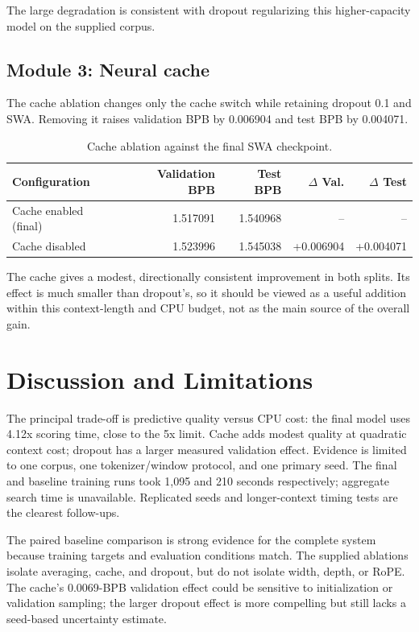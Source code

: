 \documentclass[11pt]{article}
\begin{document}
The large degradation is consistent with dropout regularizing this higher-capacity model on the supplied corpus.

\subsection{Module 3: Neural cache}
The cache ablation changes only the cache switch while retaining dropout 0.1 and SWA. Removing it raises validation BPB by 0.006904 and test BPB by 0.004071.

\begin{table}[ht]
\centering
\small
\caption{Cache ablation against the final SWA checkpoint.}
\label{tab:ablation-cache}
\begin{tabularx}{\linewidth}{@{}Xrrrr@{}}
\toprule
Configuration & Validation BPB & Test BPB & $\Delta$ Val. & $\Delta$ Test \\
\midrule
Cache enabled (final) & 1.517091 & 1.540968 & -- & -- \\
Cache disabled & 1.523996 & 1.545038 & +0.006904 & +0.004071 \\
\bottomrule
\end{tabularx}
\end{table}

The cache gives a modest, directionally consistent improvement in both splits. Its effect is much smaller than dropout's, so it should be viewed as a useful addition within this context-length and CPU budget, not as the main source of the overall gain.


\section{Discussion and Limitations}
The principal trade-off is predictive quality versus CPU cost: the final model uses 4.12x scoring time, close to the 5x limit. Cache adds modest quality at quadratic context cost; dropout has a larger measured validation effect. Evidence is limited to one corpus, one tokenizer/window protocol, and one primary seed. The final and baseline training runs took 1,095 and 210 seconds respectively; aggregate search time is unavailable. Replicated seeds and longer-context timing tests are the clearest follow-ups.

The paired baseline comparison is strong evidence for the complete system because training targets and evaluation conditions match. The supplied ablations isolate averaging, cache, and dropout, but do not isolate width, depth, or RoPE. The cache's 0.0069-BPB validation effect could be sensitive to initialization or validation sampling; the larger dropout effect is more compelling but still lacks a seed-based uncertainty estimate.
\end{document}
